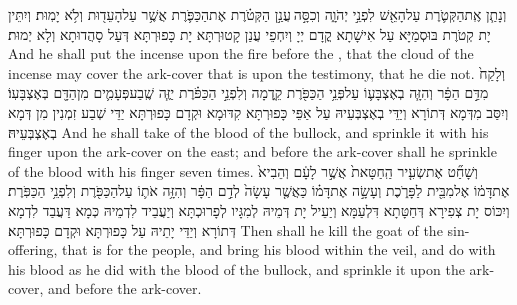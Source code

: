 {וְנָתַ֧ן אֶֽת\maqqaf הַקְּטֹ֛רֶת עַל\maqqaf הָאֵ֖שׁ לִפְנֵ֣י יְהֹוָ֑ה וְכִסָּ֣ה \legarmeh  עֲנַ֣ן הַקְּטֹ֗רֶת אֶת\maqqaf הַכַּפֹּ֛רֶת אֲשֶׁ֥ר עַל\maqqaf הָעֵד֖וּת וְלֹ֥א יָמֽוּת׃}
{וְיִתֵּין יָת קְטֹרֶת בּוּסְמַיָּא עַל אִישָׁתָא קֳדָם יְיָ וְיִחְפֵי עֲנַן קָטוּרְתָּא יָת כָּפוּרְתָּא דְּעַל סָהֲדוּתָא וְלָא יְמוּת׃}
{And he shall put the incense upon the fire before the \lord, that the cloud of the incense may cover the ark-cover that is upon the testimony, that he die not.}{}
{וְלָקַח֙ מִדַּ֣ם הַפָּ֔ר וְהִזָּ֧ה בְאֶצְבָּע֛וֹ עַל\maqqaf פְּנֵ֥י הַכַּפֹּ֖רֶת קֵ֑דְמָה וְלִפְנֵ֣י הַכַּפֹּ֗רֶת יַזֶּ֧ה שֶֽׁבַע\maqqaf פְּעָמִ֛ים מִן\maqqaf הַדָּ֖ם בְּאֶצְבָּעֽוֹ׃}
{וְיִסַּב מִדְּמָא דְּתוֹרָא וְיַדֵּי בְאֶצְבְּעֵיהּ עַל אַפֵּי כָּפוּרְתָּא קִדּוּמָא וּקְדָם כָּפוּרְתָּא יַדֵּי שְׁבַע זִמְנִין מִן דְּמָא בְאֶצְבְּעֵיהּ׃}
{And he shall take of the blood of the bullock, and sprinkle it with his finger upon the ark-cover on the east; and before the ark-cover shall he sprinkle of the blood with his finger seven times.}{}
{וְשָׁחַ֞ט אֶת\maqqaf שְׂעִ֤יר הַֽחַטָּאת֙ אֲשֶׁ֣ר לָעָ֔ם וְהֵבִיא֙ אֶת\maqqaf דָּמ֔וֹ אֶל\maqqaf מִבֵּ֖ית לַפָּרֹ֑כֶת וְעָשָׂ֣ה אֶת\maqqaf דָּמ֗וֹ כַּאֲשֶׁ֤ר עָשָׂה֙ לְדַ֣ם הַפָּ֔ר וְהִזָּ֥ה אֹת֛וֹ עַל\maqqaf הַכַּפֹּ֖רֶת וְלִפְנֵ֥י הַכַּפֹּֽרֶת׃}
{וְיִכּוֹס יָת צְפִירָא דְּחַטָּתָא דִּלְעַמָּא וְיַעֵיל יָת דְּמֵיהּ לְמִגָּיו לְפָרוּכְתָּא וְיַעֲבֵיד לִדְמֵיהּ כְּמָא דַּעֲבַד לִדְמָא דְּתוֹרָא וְיַדֵּי יָתֵיהּ עַל כָּפוּרְתָּא וּקְדָם כָּפוּרְתָּא׃}
{Then shall he kill the goat of the sin-offering, that is for the people, and bring his blood within the veil, and do with his blood as he did with the blood of the bullock, and sprinkle it upon the ark-cover, and before the ark-cover.}{}
